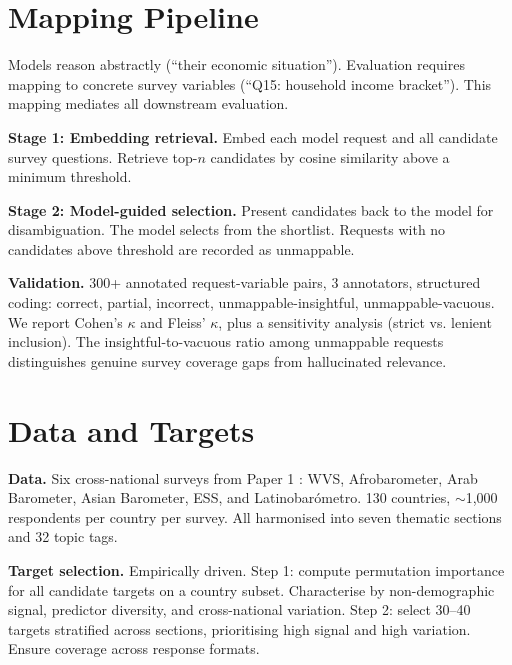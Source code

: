 \documentclass[11pt]{article}
\begin{document}
\section{Mapping Pipeline}
\label{sec:mapping}

Models reason abstractly (``their economic situation''). Evaluation requires mapping to concrete survey variables (``Q15: household income bracket''). This mapping mediates all downstream evaluation.

\textbf{Stage 1: Embedding retrieval.} Embed each model request and all candidate survey questions. Retrieve top-$n$ candidates by cosine similarity above a minimum threshold.

\textbf{Stage 2: Model-guided selection.} Present candidates back to the model for disambiguation. The model selects from the shortlist. Requests with no candidates above threshold are recorded as unmappable.

\textbf{Validation.} 300+ annotated request-variable pairs, 3 annotators, structured coding: correct, partial, incorrect, unmappable-insightful, unmappable-vacuous. We report Cohen's $\kappa$ and Fleiss' $\kappa$, plus a sensitivity analysis (strict vs. lenient inclusion). The insightful-to-vacuous ratio among unmappable requests distinguishes genuine survey coverage gaps from hallucinated relevance.


\section{Data and Targets}

\textbf{Data.} Six cross-national surveys from Paper 1 \citep{paper1}: WVS, Afrobarometer, Arab Barometer, Asian Barometer, ESS, and Latinobar\'{o}metro. 130 countries, ${\sim}$1,000 respondents per country per survey. All harmonised into seven thematic sections and 32 topic tags.

\textbf{Target selection.} Empirically driven. Step 1: compute permutation importance for all candidate targets on a country subset. Characterise by non-demographic signal, predictor diversity, and cross-national variation. Step 2: select 30--40 targets stratified across sections, prioritising high signal and high variation. Ensure coverage across response formats.


\end{document}
